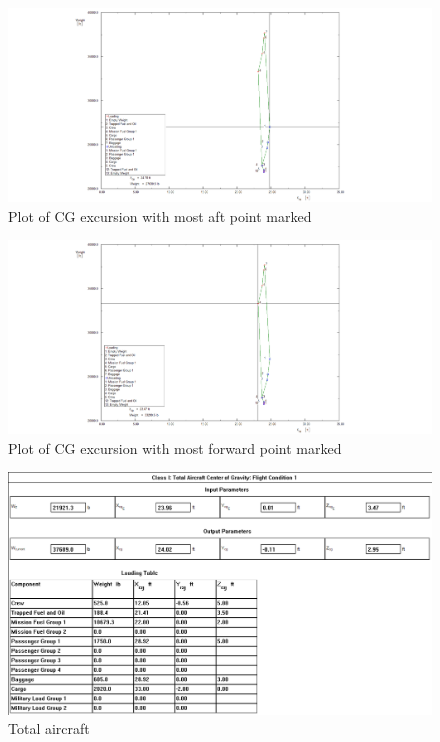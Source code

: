 \documentclass[conf]{new-aiaa}
\begin{document}
\begin{figure}
    \includegraphics[width=\textwidth]{Report3Printouts/Cg/Cg_excursion_plot_mostaft_cropped.png}
    \caption{Plot of CG excursion with most aft point marked}
    \label{fig:cg_excursion_plot_mostaft}
\end{figure}


\begin{figure}
    \includegraphics[width=\textwidth]{Report3Printouts/Cg/Cg_excursion_plot_mostforward_cropped.png}
    \caption{Plot of CG excursion with most forward point marked}
    \label{fig:cg_excursion_plot_mosforward}
\end{figure}

\begin{figure}
    \includegraphics[width=\textwidth]{Report3Printouts/Cg/Cg_TotalAircraft_cropped.png}
    \caption{Total aircraft }
    \label{fig:TODO}
\end{figure}
\end{document}
